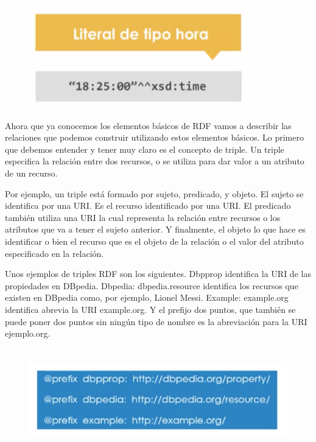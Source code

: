 \begin{figure}[H]
	\centering
	\includegraphics[height=4.5cm]{imagenes/capitulo3/12} 
	\caption{}
	\label{}
\end{figure}

Ahora que ya conocemos los elementos básicos de RDF vamos a describir las relaciones que podemos construir utilizando estos elementos básicos. Lo primero que debemos entender y tener muy claro es el concepto de triple. Un triple especifica la relación entre dos recursos, o se utiliza para dar valor a un atributo de un recurso.

Por ejemplo, un triple está formado por sujeto, predicado, y objeto. El sujeto se identifica por una URI. Es el recurso identificado por una URI. El predicado también utiliza una URI la cual representa la relación entre recursos o los atributos que va a tener el sujeto anterior. Y finalmente, el objeto lo que hace es identificar o bien el recurso que es el objeto de la relación o el valor del atributo especificado en la relación.

Unos ejemplos de triples RDF son los siguientes. Dbpprop identifica la URI de las propiedades en DBpedia. Dbpedia: dbpedia.resource identifica los recursos que existen en DBpedia como, por ejemplo, Lionel Messi. Example: example.org identifica abrevia la URI example.org. Y el prefijo dos puntos, que también se puede poner dos puntos sin ningún tipo de nombre es la abreviación para la URI ejemplo.org.

\begin{figure}[H]
	\centering
	\includegraphics[height=4.5cm]{imagenes/capitulo3/14} 
	\caption{}
	\label{}
\end{figure}

